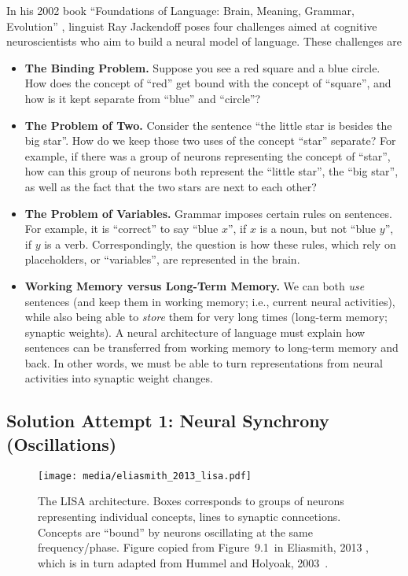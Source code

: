 \documentclass[10pt,letterpaper,oneside]{article}
\begin{document}
In his 2002 book \enquote{Foundations of Language: Brain, Meaning, Grammar, Evolution} \cite{jackendoff2002foundations}, linguist Ray Jackendoff poses four challenges aimed at cognitive neuroscientists who aim to build a neural model of language. These challenges are
\newcommand{\RS}{$\color{Crimson}\blacksquare$}
\newcommand{\BC}{$\color{RoyalBlue}\bullet$}
\begin{itemize}
	\item \textbf{The Binding Problem.} Suppose you see a red square and a blue circle. How does the concept of \enquote{red} get bound with the concept of \enquote{square}, and how is it kept separate from \enquote{blue} and \enquote{circle}?
	\item \textbf{The Problem of Two.} Consider the sentence \enquote{the little star is besides the big star}. How do we keep those two uses of the concept \enquote{star} separate? For example, if there was a group of neurons representing the concept of \enquote{star}, how can this group of neurons both represent the \enquote{little star}, the \enquote{big star}, as well as the fact that the two stars are next to each other?
	\item \textbf{The Problem of Variables.} Grammar imposes certain rules on sentences. For example, it is \enquote{correct} to say \enquote{blue $x$}, if $x$ is a noun, but not \enquote{blue $y$}, if $y$ is a verb. Correspondingly, the question is how these rules, which rely on placeholders, or \enquote{variables}, are represented in the brain.
	\item \textbf{Working Memory versus Long-Term Memory.} We can both \emph{use} sentences (and keep them in working memory; i.e., current neural activities), while also being able to \emph{store} them for very long times (long-term memory; synaptic weights). A neural architecture of language must explain how sentences can be transferred from working memory to long-term memory and back. In other words, we must be able to turn representations from neural activities into synaptic weight changes.
\end{itemize}

\subsection{Solution Attempt 1: Neural Synchrony (Oscillations)}

\begin{figure}
	\centering
	\texttt{[image: media/eliasmith\_2013\_lisa.pdf]}
	\caption{The LISA architecture. Boxes corresponds to groups of neurons representing individual concepts, lines to synaptic conncetions. Concepts are \enquote{bound} by neurons oscillating at the same frequency/phase. Figure copied from Figure~9.1~in Eliasmith, 2013 \cite{eliasmith2013how}, which is in turn adapted from Hummel and Holyoak, 2003~\cite{hummel2003symbolicconnectionist}.}
	\label{fig:eliasmith_2013_lisa.pdf}
\end{figure}
\end{document}
